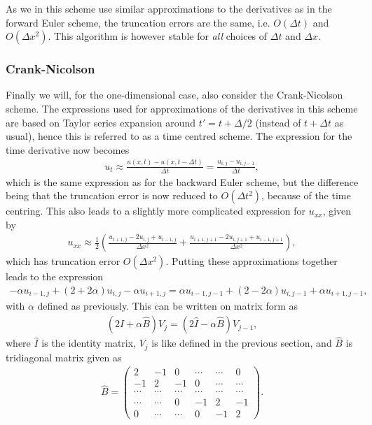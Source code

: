 \documentclass[12pt, a4paper]{article}
\begin{document}
As we in this scheme use similar approximations to the derivatives as in the forward Euler scheme, the 
truncation errors are the same, i.e. $O(\Delta t)$ and $O(\Delta x^2)$. This algorithm is however stable 
for \textit{all} choices of $\Delta t$ and $\Delta x$. 

\subsubsection{Crank-Nicolson}

Finally we will, for the one-dimensional case, also consider the Crank-Nicolson scheme. The expressions 
used for approximations of the derivatives in this scheme are based on Taylor series expansion 
around $t' = t+\Delta/2$ (instead of $t+\Delta t$ as usual), hence this is referred to as a time centred 
scheme. The expression for the time derivative now becomes 
\begin{align*}
u_t \approx \frac{u(x,t) - u(x,t-\Delta t)}{\Delta t} = \frac{u_{i,j}- u_{i,j-1}}{\Delta t}, 
\end{align*}
which is the same expression as for the backward Euler scheme, but the difference being that the 
truncation error is now reduced to $O(\Delta t^2)$, because of the time centring. This also leads to 
a slightly more complicated expression for $u_{xx}$, given by 
\begin{align*}
u_{xx} \approx \frac{1}{2}\left( \frac{u_{i+1,j} - 2u_{i,j} + u_{i-1,j}}{\Delta x^ 2} 
				+ \frac{u_{i+1,j+1} - 2u_{i,j+1} + u_{i-1,j+1}}{\Delta x^ 2}  \right),  
\end{align*} 
which has truncation error $O(\Delta x^2)$. Putting these approximations together leads to the expression 
\begin{align*}
- \alpha u_{i-1,j} + (2 + 2\alpha)u_{i,j} - \alpha u_{i+1,j} 
= \alpha u_{i-1,j-1} + (2-2\alpha) u_{i,j-1} + \alpha u_{i+1,j-1}, 
\end{align*}
with $\alpha$ defined as previously. This can be written on matrix form as 
\begin{align*}
(2 \hat{I} + \alpha \hat{B} ) V_j = (2\hat{I} - \alpha \hat{B})V_{j-1}, 
\end{align*}
where $\hat{I}$ is the identity matrix, $V_j$ is like defined in the previous section, and $\hat{B}$ is 
tridiagonal matrix given as 
\begin{align*}
\hat{B} = \left( \begin{array}{cccccc}
2 & -1 & 0 & \cdots & \cdots & 0 \\
-1 & 2 & -1 & 0 & \cdots & \cdots \\
\cdots & \cdots & \cdots & \cdots & \cdots & \cdots \\ 
\cdots & \cdots & 0 & -1 & 2 & -1 \\
0 & \cdots & \cdots & 0 & -1 & 2 
\end{array} \right). 
\end{align*}
\end{document}
